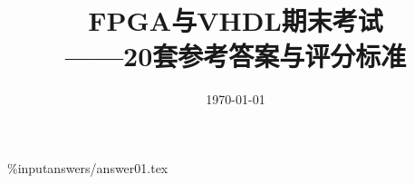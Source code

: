 \documentclass[12pt,a4paper]{ctexbook}
\title{FPGA与VHDL期末考试\\——20套参考答案与评分标准}
\author{}
\date{\today}
\begin{document}
\frontmatter

\maketitle

\tableofcontents

\mainmatter

\%input{answers/answer01.tex}




















\backmatter
\end{document}
